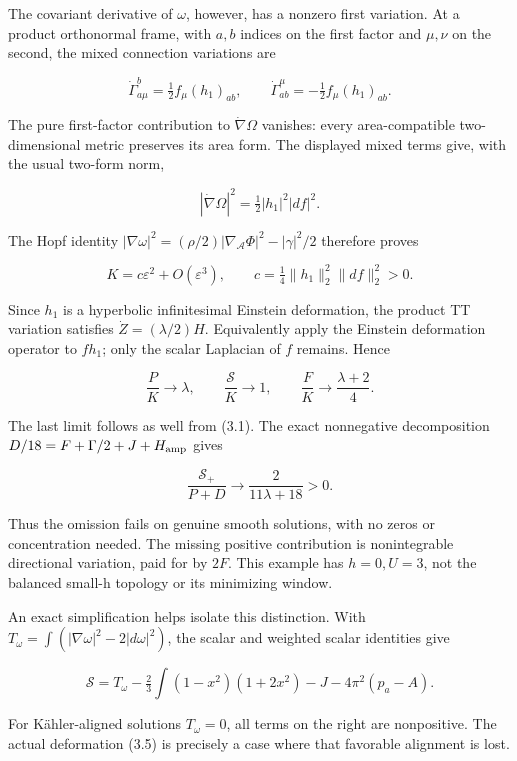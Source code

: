 \documentclass[
  10pt,
]{article}
\begin{document}
The covariant derivative of \(\omega\), however, has a nonzero first
variation. At a product orthonormal frame, with \(a,b\) indices on the
first factor and \(\mu,\nu\) on the second, the mixed connection
variations are

\[
 \dot\Gamma^b_{a\mu}=\tfrac12 f_\mu(h_1)_{ab},\qquad
 \dot\Gamma^\mu_{ab}=-\tfrac12 f_\mu(h_1)_{ab}.
\]

The pure first-factor contribution to \(\dot\nabla\Omega\) vanishes:
every area-compatible two-dimensional metric preserves its area form.
The displayed mixed terms give, with the usual two-form norm,

\[
 |\dot\nabla\Omega|^2=\tfrac12|h_1|^2|df|^2.
\]

The Hopf identity
\(|\nabla\omega|^2=(\rho/2)|\nabla_{\mathcal A}\Phi|^2-|\gamma|^2/2\)
therefore proves

\[
 K=c\varepsilon^2+O(\varepsilon^3),\qquad
 c=\tfrac14\|h_1\|_2^2\|df\|_2^2>0.              \tag{3.5}
\]

Since \(h_1\) is a hyperbolic infinitesimal Einstein deformation, the
product TT variation satisfies \(\dot Z=(\lambda/2)H\). Equivalently
apply the Einstein deformation operator to \(f h_1\); only the scalar
Laplacian of \(f\) remains. Hence

\[
 \frac PK\longrightarrow\lambda,\qquad
 \frac{\mathscr S}K\longrightarrow1,\qquad
 \frac FK\longrightarrow\frac{\lambda+2}{4}.        \tag{3.6}
\]

The last limit follows as well from (3.1). The exact nonnegative
decomposition \(D/18=F+\Gamma/2+J+H_{\rm amp}\) gives

\[
             \boxed{\frac{\mathscr S_+}{P+D}
                          \longrightarrow\frac2{11\lambda+18}>0.} \tag{3.7}
\]

Thus the omission fails on genuine smooth solutions, with no zeros or
concentration needed. The missing positive contribution is nonintegrable
directional variation, paid for by \(2F\). This example has \(h=0,U=3\),
not the balanced small-h topology or its minimizing window.

An exact simplification helps isolate this distinction. With
\(T_\omega=\int(|\nabla\omega|^2-2|d\omega|^2)\), the scalar and
weighted scalar identities give

\[
 \boxed{\mathscr S=T_\omega-
       \tfrac23\int(1-x^2)(1+2x^2)-J-4\pi^2(p_a-A).}          \tag{3.8}
\]

For Kähler-aligned solutions \(T_\omega=0\), all terms on the right are
nonpositive. The actual deformation (3.5) is precisely a case where that
favorable alignment is lost.
\end{document}
